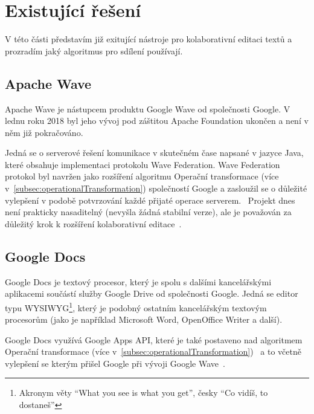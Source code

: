 
\section{Existující řešení}\label{sec:existujícíŘešení}
V této části představím již exitující nástroje pro kolaborativní editaci textů a prozradím jaký algoritmus pro sdílení používají.

\subsection{Apache Wave}\label{subsec:apacheWave}
Apache Wave je nástupcem produktu Google Wave od společnosti Google.
V lednu roku 2018 byl jeho vývoj pod záštitou Apache Foundation ukončen a není v něm již pokračováno.~\cite{wave:apache}

Jedná se o serverové řešení komunikace v skutečném čase napsané v jazyce Java, které obsahuje implementaci protokolu Wave Federation.
Wave Federation protokol byl navržen jako rozšíření algoritmu Operační transformace (více v~\ref{subsec:operationalTransformation}) společností Google a zasloužil se o důležité vylepšení v podobě potvrzování každé přijaté operace serverem.~\cite{wave:apache, wave:google}
Projekt dnes není prakticky nasaditelný (nevyšla žádná stabilní verze), ale je považován za důležitý krok k rozšíření kolaborativní editace~\cite{ot:codecommit}.

\subsection{Google Docs}\label{subsec:googleDocs}
Google Docs je textový procesor, který je spolu s dalšími kancelářskými aplikacemi součástí služby Google Drive od společnosti Google.
Jedná se editor typu WYSIWYG\footnote{Akronym věty \enquote{What you see is what you get}, česky \enquote{Co vidíš, to dostaneš}}, který je podobný ostatním kancelářským textovým procesorům (jako je například Microsoft Word, OpenOffice Writer a další).~\cite{docs:top10}

Google Docs využívá Google Apps API, které je také postaveno nad algoritmem Operační transformace (více v~\ref{subsec:operationalTransformation})~\cite{docs:conflict} a to včetně vylepšení se kterým přišel Google při vývoji Google Wave~\cite{docs:appsConf}.

